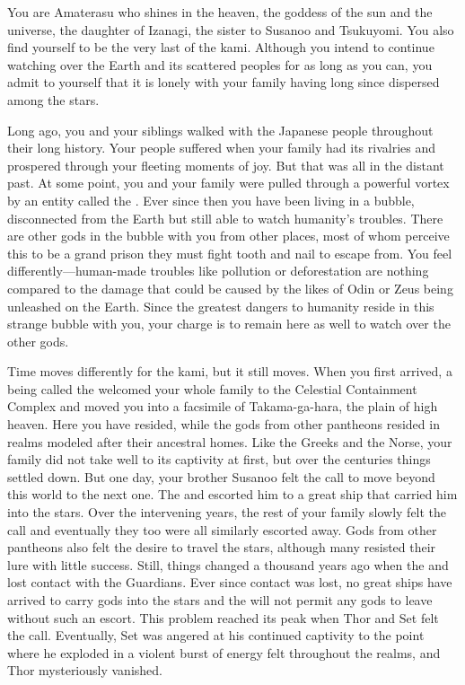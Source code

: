 \documentclass[char]{guardians}
\begin{document}
\name{\cAmaterasu{}}

You are Amaterasu who shines in the heaven, the goddess of the sun and the universe, the daughter of Izanagi, the sister to Susanoo and Tsukuyomi. You also find yourself to be the very last of the kami. Although you intend to continue watching over the Earth and its scattered peoples for as long as you can, you admit to yourself that it is lonely with your family having long since dispersed among the stars.

Long ago, you and your siblings walked with the Japanese people throughout their long history. Your people suffered when your family had its rivalries and prospered through your fleeting moments of joy. But that was all in the distant past. At some point, you and your family were pulled through a powerful vortex by an entity called the \cWarden{}. Ever since then you have been living in a bubble, disconnected from the Earth but still able to watch humanity's troubles. There are other gods in the bubble with you from other places, most of whom perceive this to be a grand prison they must fight tooth and nail to escape from. You feel differently---human-made troubles like pollution or deforestation are nothing compared to the damage that could be caused by the likes of Odin or Zeus being unleashed on the Earth. Since the greatest dangers to humanity reside in this strange bubble with you, your charge is to remain here as well to watch over the other gods.

Time moves differently for the kami, but it still moves. When you first arrived, a being called the \cCaretaker{} welcomed your whole family to the Celestial Containment Complex and moved you into a facsimile of Takama-ga-hara, the plain of high heaven. Here you have resided, while the gods from other pantheons resided in realms modeled after their ancestral homes. Like the Greeks and the Norse, your family did not take well to its captivity at first, but over the centuries things settled down. But one day, your brother Susanoo felt the call to move beyond this world to the next one. The \cCaretaker{} and \cWarden{} escorted him to a great ship that carried him into the stars. Over the intervening years, the rest of your family slowly felt the call and eventually they too were all similarly escorted away. Gods from other pantheons also felt the desire to travel the stars, although many resisted their lure with little success. Still, things changed a thousand years ago when the \cCaretaker{} and \cWarden{} lost contact with the Guardians. Ever since contact was lost, no great ships have arrived to carry gods into the stars and the \cWarden{} will not permit any gods to leave without such an escort. This problem reached its peak when Thor and Set felt the call. Eventually, Set was angered at his continued captivity to the point where he exploded in a violent burst of energy felt throughout the realms, and Thor mysteriously vanished.
\end{document}
